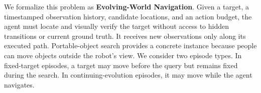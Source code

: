 
We formalize this problem as \textbf{Evolving-World Navigation}. 
Given a target, a timestamped observation history, candidate locations, and an action budget, the agent must locate and visually verify the target without access to hidden transitions or current ground truth. 
It receives new observations only along its executed path. 
Portable-object search provides a concrete instance because people can move objects outside the robot's view. 
We consider two episode types. 
In fixed-target episodes, a target may move before the query but remains fixed during the search. 
In continuing-evolution episodes, it may move while the agent navigates.


